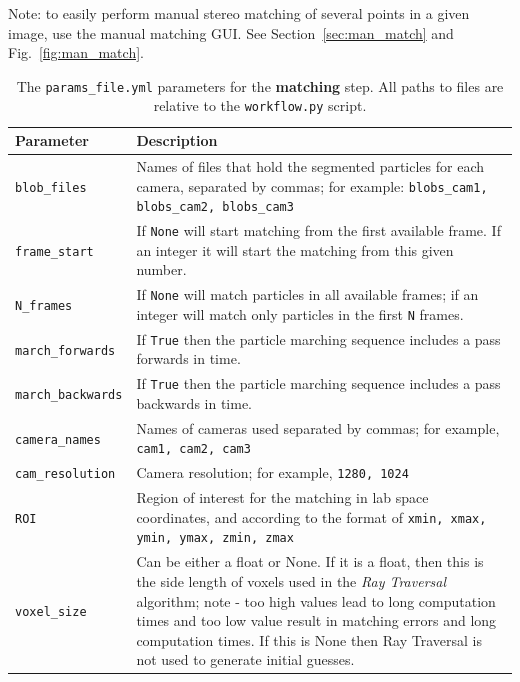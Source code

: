 \documentclass[10pt,a4paper]{article}
\begin{document}
Note: to easily perform manual stereo matching of several points in a given image, use the manual matching GUI. See Section~\ref{sec:man_match} and Fig.~\ref{fig:man_match}.


\begin{table}[!ht]
	\centering
	\caption{The \texttt{params\_file.yml} parameters for the \textbf{matching} step. All paths to files are relative to the \texttt{workflow.py} script.}
	\label{tab:matching}
	\begin{tabular}{l m{13cm}}
		\hline
		Parameter & Description\\[.1cm]
		\hline
		
		\texttt{blob\_files} & Names of files that hold the segmented particles for each camera, separated by commas; for example: \texttt{blobs\_cam1, blobs\_cam2, blobs\_cam3} \\[.1cm]
		
		\texttt{frame\_start} & If \texttt{None} will start matching from the first available frame. If an integer it will start the matching from this given number. \\[.1cm]
		
		\texttt{N\_frames} & If \texttt{None} will match particles in all available frames; if an integer will match only particles in the first \texttt{N} frames. \\[.1cm]
		
		\texttt{march\_forwards} & If \texttt{True} then the particle marching sequence includes a pass forwards in time. \\[.1cm]
		
		\texttt{march\_backwards} & If \texttt{True} then the particle marching sequence includes a pass backwards in time. \\[.1cm]
		
		\texttt{camera\_names} & Names of cameras used separated by commas; for example, \texttt{cam1, cam2, cam3} \\[.1cm]
		
		\texttt{cam\_resolution} & Camera resolution; for example, \texttt{1280, 1024} \\[.1cm]
		
		\texttt{ROI} & Region of interest for the matching in lab space coordinates, and according to the format of \texttt{xmin, xmax, ymin, ymax, zmin, zmax} \\[.1cm]
		
		\texttt{voxel\_size} & Can be either a float or None. If it is a float, then this is the side length of voxels used in the \textit{Ray Traversal} algorithm; note - too high values lead to long computation times and too low value result in matching errors and long computation times. If this is None then Ray Traversal is not used to generate initial guesses. \\[.1cm]
		

\end{tabular}
\end{table}
\end{document}
